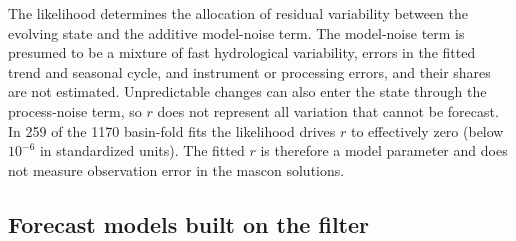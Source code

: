 \documentclass[hess, manuscript]{copernicus}
\begin{document}
The likelihood determines the allocation of residual variability between
the evolving state and the additive model-noise term. The model-noise
term is presumed to be a mixture of fast hydrological variability, errors
in the fitted trend and seasonal cycle, and instrument or processing
errors, and their shares are not estimated. Unpredictable changes can also
enter the state through the process-noise term, so $r$ does not represent
all variation that cannot be forecast.
In 259 of the 1170 basin-fold fits the likelihood drives $r$ to
effectively zero (below $10^{-6}$ in standardized units). The fitted $r$
is therefore a model parameter and does not measure observation error in
the mascon solutions.

\subsection{Forecast models built on the filter}
\label{sec:methods-corrections}
\end{document}
